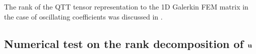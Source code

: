 \documentclass[amstex,amstext,amsfonts,epsf,12pt] {amsart}
\newtheorem{proposition}[theorem]{Proposition}
\begin{document}

The rank of the QTT tensor representation to the 1D Galerkin FEM matrix 
in the case of oscillating coefficients 
was discussed in \cite{DoKazKh_1DSPDE:12,BokhSRep:15}.



\subsection{Numerical test on the rank decomposition of ${\bf u}$}\label{ssec:LowRankSolut}
\end{document}

